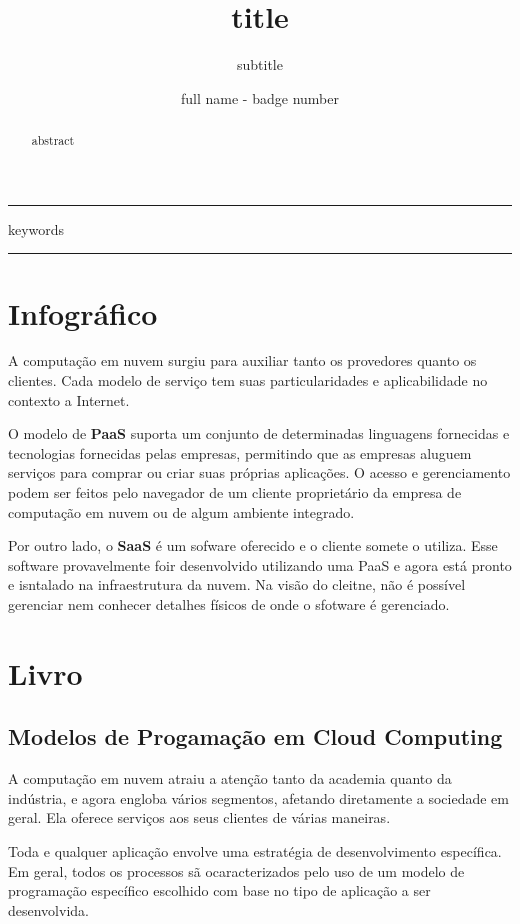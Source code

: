 \documentclass[12pt, a4paper]{paper}
\title{title \\
}
\subtitle{subtitle}
\author{full name - badge number}
\begin{document}
\maketitle

\hrule
\begin{abstract}
  abstract
\end{abstract}
\vspace{-0.6cm} %
\begin{keywords}
  keywords
\end{keywords}
\hrule

\section{Infográfico} %
\label{sec:Infográfico}
A computação em nuvem surgiu para auxiliar tanto os provedores quanto os clientes. Cada modelo de serviço tem suas particularidades e aplicabilidade no contexto a Internet. 

O modelo de \textbf{PaaS} suporta um conjunto de determinadas linguagens fornecidas 
e tecnologias fornecidas pelas empresas, permitindo que as empresas aluguem serviços 
para comprar ou criar suas próprias aplicações. O acesso e gerenciamento podem ser 
feitos pelo navegador de um cliente proprietário da empresa de computação em nuvem ou de
algum ambiente integrado. 

Por outro lado, o \textbf{SaaS} é um sofware oferecido e o cliente somete o utiliza. 
Esse software provavelmente foir desenvolvido utilizando uma PaaS e agora está pronto 
e isntalado na infraestrutura da nuvem. Na visão do cleitne, não é possível gerenciar 
nem conhecer detalhes físicos de onde o sfotware é gerenciado.

\section{Livro} %
\label{sec:Livro}

\subsection{Modelos de Progamação em Cloud Computing} %
\label{sub:Modelos de Progamação em Cloud Computing}
A computação em nuvem atraiu a atenção tanto da academia quanto da indústria, e agora engloba vários segmentos, afetando diretamente a sociedade em geral. Ela oferece serviços aos seus clientes de várias maneiras. 

Toda e qualquer aplicação envolve uma estratégia de desenvolvimento específica. Em geral, todos os processos sã ocaracterizados pelo uso de um modelo de programação específico escolhido com base no tipo de aplicação a ser desenvolvida.
\end{document}
